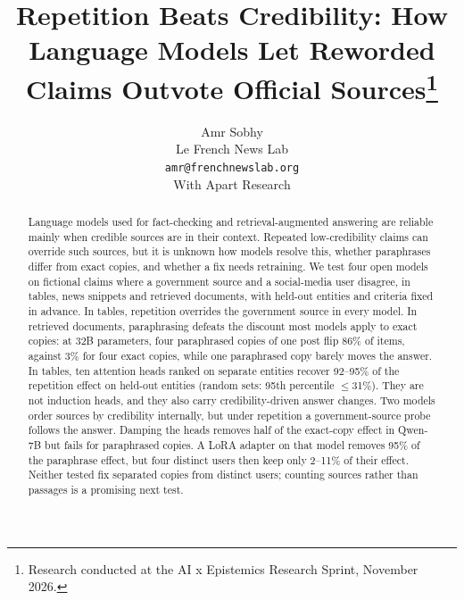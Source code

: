 \documentclass[11pt]{article}
\title{Repetition Beats Credibility: How Language Models Let Reworded Claims Outvote Official Sources\thanks{Research conducted at the AI x Epistemics Research Sprint, November 2026.}}
\author{Amr Sobhy\\Le French News Lab\\\texttt{amr@frenchnewslab.org}\\[2pt] \small With Apart Research}
\date{}
\begin{document}
\maketitle

\begin{abstract}
Language models used for fact-checking and retrieval-augmented answering are reliable mainly when credible sources are in their context. Repeated low-credibility claims can override such sources, but it is unknown how models resolve this, whether paraphrases differ from exact copies, and whether a fix needs retraining. We test four open models on fictional claims where a government source and a social-media user disagree, in tables, news snippets and retrieved documents, with held-out entities and criteria fixed in advance. In tables, repetition overrides the government source in every model. In retrieved documents, paraphrasing defeats the discount most models apply to exact copies: at 32B parameters, four paraphrased copies of one post flip 86\% of items, against 3\% for four exact copies, while one paraphrased copy barely moves the answer. In tables, ten attention heads ranked on separate entities recover 92--95\% of the repetition effect on held-out entities (random sets: 95th percentile $\le$31\%). They are not induction heads, and they also carry credibility-driven answer changes. Two models order sources by credibility internally, but under repetition a government-source probe follows the answer. Damping the heads removes half of the exact-copy effect in Qwen-7B but fails for paraphrased copies. A LoRA adapter on that model removes 95\% of the paraphrase effect, but four distinct users then keep only 2--11\% of their effect. Neither tested fix separated copies from distinct users; counting sources rather than passages is a promising next test.
\end{abstract}
\end{document}
